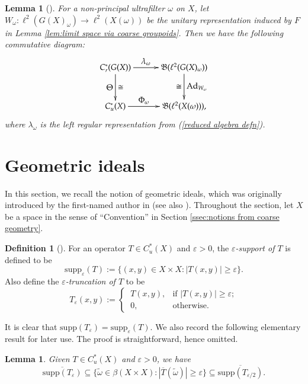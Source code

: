 \documentclass[12pt, a4paper]{amsart}
\numberwithin{equation}{section}
\newtheorem{lem}[thm]{Lemma}
\theoremstyle{definition}
\newtheorem{defn}[thm]{Definition}
\theoremstyle{remark}
\def\B{\mathfrak{B}}
\def\supp{\mathrm{supp}}
\begin{document}
\begin{lem}[{\cite[Lemma C.3]{SW17}}]\label{lem:limit operators via regular representation}
For a non-principal ultrafilter $\omega$ on $X$, let $W_\omega: \ell^2(G(X)_\omega) \to \ell^2(X(\omega))$ be the unitary representation induced by $F$ in Lemma \ref{lem:limit space via coarse groupoids}. Then we have the following commutative diagram:
\begin{displaymath}
    \xymatrix@=3em{
        C^*_r(G(X)) \ar[r]^-{\textstyle \lambda_\omega} \ar[d]_-{\textstyle\Theta}^-{\textstyle\cong} & \B(\ell^2(G(X)_\omega)) \ar[d]^-{\textstyle \mathrm{Ad}_{W_\omega}}_-{\textstyle\cong} \\
        C^*_u(X) \ar[r]^-{\textstyle \Phi_\omega} & \B(\ell^2(X(\omega))),}
\end{displaymath}
where $\lambda_\omega$ is the left regular representation from (\ref{reduced algebra defn}).
\end{lem}



\section{Geometric ideals}\label{sec:geometric ideals}

In this section, we recall the notion of geometric ideals, which was originally introduced by the first-named author in \cite{Wan07} (see also \cite{CW04}). 
Throughout the section, let $X$ be a space in the sense of ``Convention'' in Section \ref{ssec:notions from coarse geometry}.

\begin{defn}[{\cite[Definition 3.1, 3.3]{CW04}}]\label{defn: epsilon supp}
For an operator $T \in C^*_u(X)$ and $\varepsilon>0$, the \emph{$\varepsilon$-support of $T$} is defined to be
\[
\supp_\varepsilon(T):=\{(x,y)\in X \times X: |T(x,y)| \geq \varepsilon\}.
\]
Also define the \emph{$\varepsilon$-truncation of $T$} to be
\[
T_\varepsilon(x,y):=
\begin{cases}
~T(x,y), & \mbox{if~} |T(x,y)| \geq \varepsilon; \\
~0, & \mbox{otherwise}.
\end{cases}
\]
\end{defn}

It is clear that $\supp(T_\varepsilon) = \supp_\varepsilon(T)$. We also record the following elementary result for later use. The proof is straightforward, hence omitted.
\begin{lem}\label{lem: support containment}
Given $T \in C^*_u(X)$ and $\varepsilon>0$, we have
\[
\overline{\supp(T_\varepsilon)} \subseteq \{\tilde{\omega} \in \beta(X \times X): |\overline{T}(\tilde{\omega})| \geq \varepsilon\} \subseteq  \overline{\supp(T_{\varepsilon/2})}.
\]
\end{lem}
\end{document}

